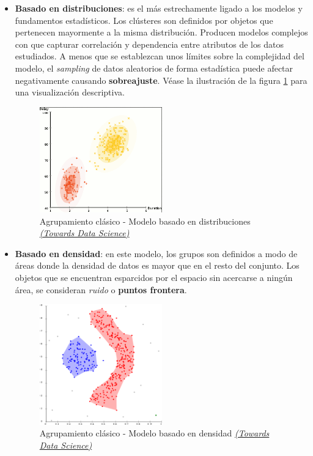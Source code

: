 \documentclass[]{report}
\begin{document}
\begin{itemize}
				\item \textbf{Basado en distribuciones}: es el más estrechamente ligado a los modelos y fundamentos estadísticos. Los clústeres son definidos por objetos que pertenecen mayormente a la misma distribución. Producen modelos complejos con que capturar correlación y dependencia entre atributos de los datos estudiados. A menos que se establezcan unos límites sobre la complejidad del modelo, el \textit{sampling} de datos aleatorios de forma estadística puede afectar negativamente causando \textbf{sobreajuste}. Véase la ilustración de la figura \ref{clustering-distribuciones} para una visualización descriptiva.
				
				\begin{figure}[h!]
					\centering
					\includegraphics[width=0.5\textwidth]{clustering_distribuciones.png}
					\caption{Agrupamiento clásico - Modelo basado en distribuciones \href{https://towardsdatascience.com/the-5-clustering-algorithms-data-scientists-need-to-know-a36d136ef68}{ \textit{(Towards Data Science)}}}
					\label{clustering-distribuciones}
				\end{figure}
				
				\item \textbf{Basado en densidad}: en este modelo, los grupos son definidos a modo de áreas donde la densidad de datos es mayor que en el resto del conjunto. Los objetos que se encuentran esparcidos por el espacio sin acercarse a ningún área, se consideran \textit{ruido} o \textbf{puntos frontera}.
				
				\begin{figure}[h!]
					\centering
					\includegraphics[width=0.5\textwidth]{clustering_densidad.png}
					\caption{Agrupamiento clásico - Modelo basado en densidad \href{https://towardsdatascience.com/the-5-clustering-algorithms-data-scientists-need-to-know-a36d136ef68}{ \textit{(Towards Data Science)}}}
					\label{clustering-densidad}
				\end{figure}				
			\end{itemize}
		
\end{document}
